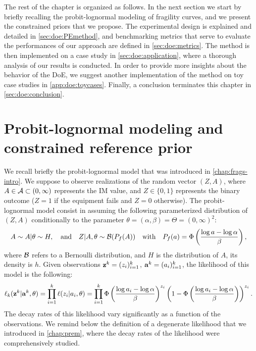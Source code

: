 The rest of the chapter is organized as follows. In the next section we start by briefly recalling the probit-lognormal modeling of fragility curves, and we 
present the constrained priors that we propose.
The experimental design is explained and detailed in \cref{sec:doe:PEmethod}, and benchmarking metrics that serve to evaluate the performances of our approach are defined in \cref{sec:doe:metrics}. 
The method is then implemented on a case study in \cref{sec:doe:application}, where a thorough analysis of our results is conducted.
In order to provide more insights about the behavior of the DoE, we suggest another implementation of the method on toy case studies in \cref{app:doe:toycases}. Finally, a conclusion terminates this chapter in \cref{sec:doe:conclusion}.






\section{Probit-lognormal modeling and constrained reference prior}\label{sec:doe:model}

We recall briefly the probit-lognormal model that was introduced in \cref{chap:frags-intro}. We suppose to observe realizations of the random vector $(Z,A)$, where $A\in\mathcal{A}\subset(0,\infty)$ represents the IM value, and $Z\in\{0,1\}$ represents the binary outcome ($Z=1$ if the equipment fails and $Z=0$ otherwise).
The probit-lognormal model consist in assuming the following parameterized distribution of $(Z,A)$ conditionally to the parameter $\theta=(\alpha,\beta)=\Theta=(0,\infty)^2$:
    \begin{equation}
        A\sim A|\theta\sim H,\quad\text{and}\quad Z|A,\theta\sim\mathcal{B}(P_f(A))\quad\text{with}\quad P_f(a)=\Phi\left(\frac{\log a-\log\alpha}{\beta}\right),
    \end{equation}
where $\mathcal{B}$ refers to a Bernoulli distribution, and $H$ is the distribution of $A$, its density is $h$. %
Given observations $\mathbf{z}^k=(z_i)_{i=1}^k$, $\mathbf{a}^k=(a_i)_{i=1}^k$, the likelihood of this model is the following:
    \begin{equation}
        \ell_k(\mathbf{z}^k|\mathbf{a}^k,\theta) = \prod_{i=1}^{k}\ell(z_i|a_i,\theta) = \prod_{i=1}^k\Phi\left(\frac{\log a_i-\log\alpha}{\beta}\right)^{z_i}\left(1-\Phi\left(\frac{\log a_i-\log\alpha}{\beta}\right)\right)^{z_i}.
    \end{equation}
The decay rates of this likelihood vary significantly as a function of the observations. We remind below the definition of a degenerate likelihood that we introduced in \cref{chap:prem}, where the decay rates of the likelihood were comprehensively studied.

